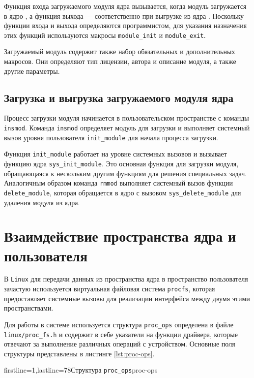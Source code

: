 Функция входа загружаемого модуля ядра вызывается, когда модуль загружается в ядро , а функция выхода –-- соответственно при выгрузке из ядра \cite{vahalia}. Поскольку функции входа и выхода определяются программистом, для указания назначения этих функций используются макросы \texttt{module\_init} и \texttt{module\_exit}. 

Загружаемый модуль содержит также набор обязательных и дополнительных макросов. Они определяют тип лицензии, автора и описание модуля, а также другие параметры.


\subsection{Загрузка и выгрузка загружаемого модуля ядра}

Процесс загрузки модуля начинается в пользовательском пространстве с команды \texttt{insmod}. Команда \texttt{insmod} определяет модуль для загрузки и выполняет системный вызов уровня пользователя \texttt{init\_module} для начала процесса загрузки.

Функция \texttt{init\_module} работает на уровне системных вызовов и вызывает функцию  ядра  \texttt{sys\_init\_module}.  Это  основная  функция  для загрузки модуля, обращающаяся к нескольким другим функциям для решения специальных  задач.  Аналогичным  образом  команда  \texttt{rmmod}  выполняет системный  вызов  функции  \texttt{delete\_module},  которая  обращается  в  ядро  с вызовом \texttt{sys\_delete\_module} для удаления модуля из ядра.


\section{Взаимдействие пространства ядра и пользователя}

В \texttt{Linux} для передачи данных из пространства ядра в пространство пользователя зачастую используется виртуальная файловая система \texttt{procfs}, которая предоставляет системные вызовы для реализации интерфейса между двумя этими пространствами. 

Для работы в системе используется структура \texttt{proc\_ops} определена в файле \texttt{linux/proc\_fs.h} и содержит в себе указатели на функции драйвера, которые отвечают за выполнение различных операций с устройством. Основные поля структуры представлены в листинге \ref{lst:proc-ops}.

        {firstline=1,lastline=78}{Структура \texttt{proc\_ops}}{proc-ops}{}

